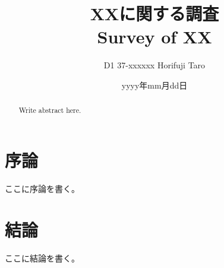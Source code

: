 \documentclass[10pt,a4paper,oneside,twocolumn,fleqn,dvipdfmx]{jarticle}
\title{XXに関する調査\\ Survey of XX}
\author{D1 37-xxxxxx Horifuji Taro}
\date{yyyy年mm月dd日}
\begin{document}

\begin{abstract}
    Write abstract here.
\end{abstract}

\maketitle

\section{序論}
ここに序論を書く。

\section{結論}
ここに結論を書く。



\end{document}
